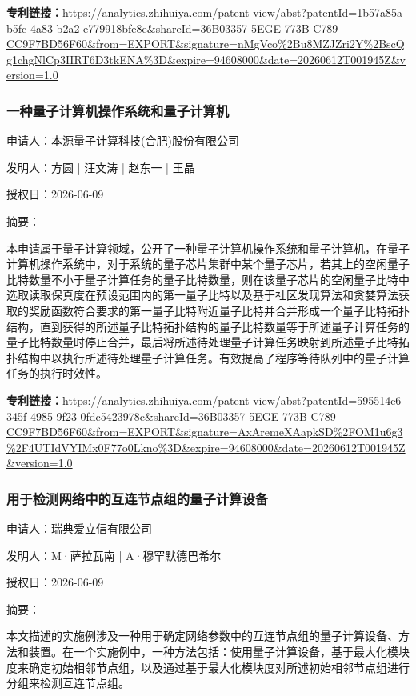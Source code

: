 \documentclass[12pt,a4paper]{ctexart}
\begin{document}
\noindent\textbf{专利链接：}\url{https://analytics.zhihuiya.com/patent-view/abst?patentId=1b57a85a-b5fc-4a83-b2a2-e779918bfe8e&shareId=36B03357-5EGE-773B-C789-CC9F7BD56F60&from=EXPORT&signature=nMgVco%2Bu8MZJZri2Y%2BscQg1chgNlCp3IIRT6D3tkENA%3D&expire=94608000&date=20260612T001945Z&version=1.0}

\subsubsection{ 一种量子计算机操作系统和量子计算机 }

申请人：本源量子计算科技(合肥)股份有限公司

发明人：方圆 | 汪文涛 | 赵东一 | 王晶

授权日：2026-06-09

摘要：

本申请属于量子计算领域，公开了一种量子计算机操作系统和量子计算机，在量子计算机操作系统中，对于系统的量子芯片集群中某个量子芯片，若其上的空闲量子比特数量不小于量子计算任务的量子比特数量，则在该量子芯片的空闲量子比特中选取读取保真度在预设范围内的第一量子比特以及基于社区发现算法和贪婪算法获取的奖励函数符合要求的第一量子比特附近量子比特并合并形成一个量子比特拓扑结构，直到获得的所述量子比特拓扑结构的量子比特数量等于所述量子计算任务的量子比特数量时停止合并，最后将所述待处理量子计算任务映射到所述量子比特拓扑结构中以执行所述待处理量子计算任务。有效提高了程序等待队列中的量子计算任务的执行时效性。

\noindent\textbf{专利链接：}\url{https://analytics.zhihuiya.com/patent-view/abst?patentId=595514e6-345f-4985-9f23-0fdc5423978c&shareId=36B03357-5EGE-773B-C789-CC9F7BD56F60&from=EXPORT&signature=AxAremeXAapkSD%2FOM1u6g3%2F4UTIdVYIMx0F77o0Lkno%3D&expire=94608000&date=20260612T001945Z&version=1.0}

\subsubsection{ 用于检测网络中的互连节点组的量子计算设备 }

申请人：瑞典爱立信有限公司

发明人：M·萨拉瓦南 | A·穆罕默德巴希尔

授权日：2026-06-09

摘要：

本文描述的实施例涉及一种用于确定网络参数中的互连节点组的量子计算设备、方法和装置。在一个实施例中，一种方法包括：使用量子计算设备，基于最大化模块度来确定初始相邻节点组，以及通过基于最大化模块度对所述初始相邻节点组进行分组来检测互连节点组。
\end{document}
